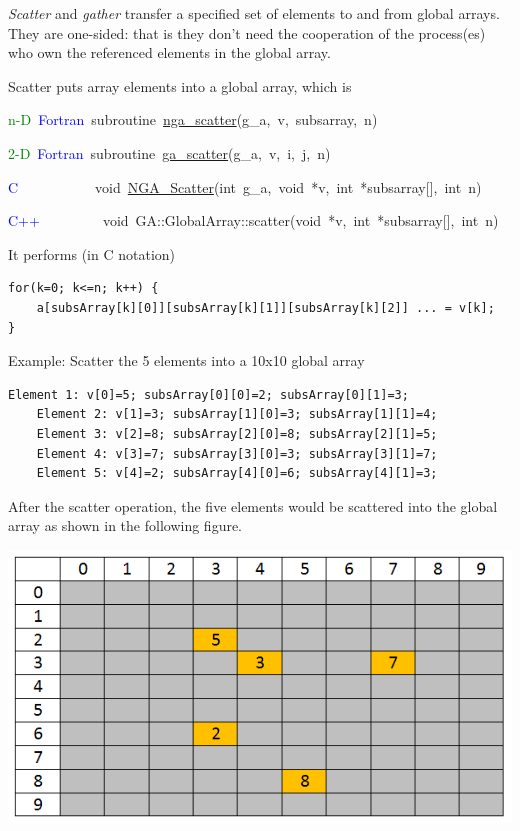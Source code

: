 \emph{Scatter} and \emph{gather} transfer a specified set of elements
to and from global arrays. They are one-sided: that is they don't
need the cooperation of the process(es) who own the referenced elements
in the global array.

Scatter puts array elements into a global array, which is

\textcolor{green}{n-D}~\textcolor{blue}{Fortran}~subroutine~\href{https://hpc.pnl.gov/globalarrays/api/f_op_api.html\#ga_scatter}{nga\_{}scatter}(g\_a,~v,~subsarray,~n)~

\textcolor{green}{2-D}~\textcolor{blue}{Fortran}~subroutine~\href{https://hpc.pnl.gov/globalarrays/api/f_op_api.html\#ga_scatter}{ga\_{}scatter}(g\_a,~v,~i,~j,~n)~

\textcolor{blue}{C}~~~~~~~~~~~void~\href{https://hpc.pnl.gov/globalarrays/api/c_op_api.html\#ga_scatter}{NGA\_{}Scatter}(int~g\_a,~void~{*}v,~int~{*}subsarray{[}{]},~int~n)~

\textcolor{blue}{C++~}~~~~~~~~void~GA::GlobalArray::scatter(void~{*}v,~int~{*}subsarray{[}{]},~int~n)

It performs (in C notation)

\begin{lstlisting}[style=cppnoframe]
for(k=0; k<=n; k++) {
    a[subsArray[k][0]][subsArray[k][1]][subsArray[k][2]] ... = v[k];
}
\end{lstlisting}

{Example}: Scatter the 5 elements into a 10x10 global array
\begin{lstlisting}[style=cpp]
    Element 1: v[0]=5; subsArray[0][0]=2; subsArray[0][1]=3;
    Element 2: v[1]=3; subsArray[1][0]=3; subsArray[1][1]=4;
    Element 3: v[2]=8; subsArray[2][0]=8; subsArray[2][1]=5;
    Element 4: v[3]=7; subsArray[3][0]=3; subsArray[3][1]=7;
    Element 5: v[4]=2; subsArray[4][0]=6; subsArray[4][1]=3;
\end{lstlisting}

After the scatter operation, the five elements would be scattered
into the global array as shown in the following figure. 

\includegraphics[scale=0.6]{scatter-GA}

